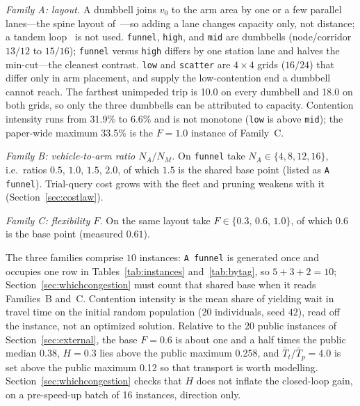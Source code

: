 \documentclass[manuscript,screen,review]{acmart}
\newcommand{\NCases}{10}
\newcommand{\ContentionLo}{6.6\%}
\newcommand{\ContentionHi}{33.5\%}
\newcommand{\ContentionAHi}{31.9\%}
\newcommand{\LegDumbbell}{10.0}          %
\newcommand{\LegGrid}{18.0}              %
\newcommand{\MatrixCells}{16}
\newcommand{\PubFMed}{0.38}              %
\newcommand{\PubHMax}{0.258}             %
\newcommand{\PubTtTpHi}{0.12}            %
\newcommand{\PubNInst}{20}
\begin{document}
\emph{Family A: layout.}
A dumbbell joins $v_0$ to the arm area by one or a few parallel lanes---the spine layout of~\cite{suh2022spine}---so adding a lane changes capacity only, not distance; a tandem loop~\cite{rahimikelarijani2020tandem} is not used.
\texttt{funnel}, \texttt{high}, and \texttt{mid} are dumbbells (node/corridor $13/12$ to $15/16$); \texttt{funnel} versus \texttt{high} differs by one station lane and halves the min-cut---the cleanest contrast.
\texttt{low} and \texttt{scatter} are $4\times4$ grids ($16/24$) that differ only in arm placement, and supply the low-contention end a dumbbell cannot reach.
The farthest unimpeded trip is \LegDumbbell{} on every dumbbell and \LegGrid{} on both grids, so only the three dumbbells can be attributed to capacity.
Contention intensity runs from \ContentionAHi{} to \ContentionLo{} and is not monotone (\texttt{low} is above \texttt{mid}); the paper-wide maximum \ContentionHi{} is the $F=1.0$ instance of Family~C.

\emph{Family B: vehicle-to-arm ratio $N_A/N_M$.}
On \texttt{funnel} take $N_A\in\{4,8,12,16\}$, i.e.\ ratios $0.5$, $1.0$, $1.5$, $2.0$, of which $1.5$ is the shared base point (listed as \texttt{A funnel}).
Trial-query cost grows with the fleet and pruning weakens with it (Section~\ref{sec:costlaw}).

\emph{Family C: flexibility $F$.}
On the same layout take $F\in\{0.3,\,0.6,\,1.0\}$, of which $0.6$ is the base point (measured $0.61$).

The three families comprise $\NCases$ instances: \texttt{A funnel} is generated once and occupies one row in Tables~\ref{tab:instances} and~\ref{tab:bytag}, so $5+3+2=\NCases$; Section~\ref{sec:whichcongestion} must count that shared base when it reads Families~B and~C.
Contention intensity is the mean share of yielding wait in travel time on the initial random population ($20$ individuals, seed $42$), read off the instance, not an optimized solution.
Relative to the \PubNInst{} public instances of Section~\ref{sec:external}, the base $F=0.6$ is about one and a half times the public median \PubFMed{}, $H=0.3$ lies above the public maximum \PubHMax{}, and $\bar{T}_t/\bar{T}_p=4.0$ is set above the public maximum \PubTtTpHi{} so that transport is worth modelling.
Section~\ref{sec:whichcongestion} checks that $H$ does not inflate the closed-loop gain, on a pre-speed-up batch of \MatrixCells{} instances, direction only.

\begin{table}[t]
\caption{Controlled instances.
Shared core: $12$ jobs, $36$ operations, $8$ arms, $H=0.3$, $\bar{T}_t/\bar{T}_p\approx4.0$.
Contention intensity is yielding wait as a share of travel time on the initial random population.}
\label{tab:instances}
\small

\end{table}
\end{document}

